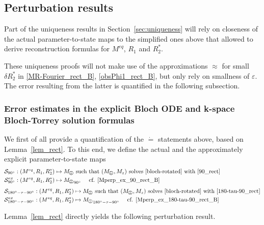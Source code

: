 \documentclass{ws-m3as}
\def\Mpp{M_{\perp\!\!\!\!\!\bigcirc}}
\newcommand\taup{\varepsilon}
\newcommand{\revision}[1]{{ #1}}
\newcommand{\Margin}[1]{}
\begin{document}
\subsection{Perturbation results}

Part of the uniqueness results in Section~\ref{sec:uniqueness} will rely on closeness of the actual parameter-to-state maps to the simplified ones above that allowed to derive reconstruction formulas for $M^{eq}$, $R_1$ and $R_2^*$. 

These uniqueness proofs will not make use of the approximations $\approx$ for small $\delta R_2^*$ in 
\eqref{MR-Fourier_rect_B}, 
\eqref{obsPhi1_rect_B}, but only rely on smallness of $\taup$. 
The error resulting from the latter is quantified in the following subsection.

\subsubsection{Error estimates in the explicit 
Bloch ODE 
and k-space Bloch-Torrey 
solution formulas}\label{subsec:err-ex}
We first of all provide a quantification of the $\dot{=}$ statements above, based on Lemma~\ref{lem_rect}.
To this end, we define the actual and the approximately explicit  parameter-to-state maps 
\begin{equation}\label{S_90_180}
\begin{aligned}
&\mathcal{S}_{90^\circ}:(M^{eq},R_1,R_2^*) \mapsto \Mpp 
\text{ such that $(\Mpp,M_z)$ solves \eqref{bloch-rotated} with 
\eqref{90_rect}}\\
&\mathcal{S}_{90^\circ}^{ex}:(M^{eq},R_1,R_2^*) \mapsto {\Mpp}_{90^\circ}\quad
\text{ cf. \eqref{Mperp_ex_90_rect_B}}
\\[1ex]
&\mathcal{S}_{180^\circ-\tau-90^\circ}:(M^{eq},R_1,R_2^*) \mapsto \Mpp 
\text{ such that $(\Mpp,M_z)$ solves \eqref{bloch-rotated} with 
\eqref{180-tau-90_rect}}\\
&\mathcal{S}_{180^\circ-\tau-90^\circ}^{ex}:(M^{eq},R_1,R_2^*) \mapsto {\Mpp}_{180^\circ-\tau-90^\circ}\quad
\text{ cf. \eqref{Mperp_ex_180-tau-90_rect_B}}
\end{aligned}
\end{equation}

\revision{Lemma~\ref{lem_rect} directly yields the following perturbation result.}
\Margin{R1 D.} 
\end{document}
